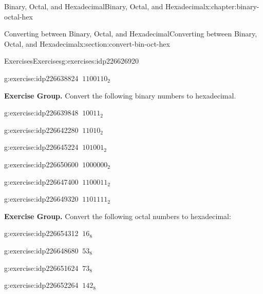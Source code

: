 \documentclass[twoside,10pt,]{book}
\numberwithin{equation}{section}
\begin{document}
\begin{chapterptx}{Binary, Octal, and Hexadecimal}{}{Binary, Octal, and Hexadecimal}{}{}{x:chapter:binary-octal-hex}
\begin{sectionptx}{Converting between Binary, Octal, and Hexadecimal}{}{Converting between Binary, Octal, and Hexadecimal}{}{}{x:section:convert-bin-oct-hex}
\begin{exercises-subsection}{Exercises}{}{Exercises}{}{}{g:exercises:idp226626920}
\begin{exercisegroup}
\begin{divisionexerciseeg}{18}{}{}{g:exercise:idp226638824}%
\(\ 1100110_2\)\end{divisionexerciseeg}%
\end{exercisegroup}
\par\medskip\noindent
\par\medskip\noindent%
\textbf{Exercise Group.}\space\space%
Convert the following binary numbers to hexadecimal.\begin{exercisegroup}
\begin{divisionexerciseeg}{19}{}{}{g:exercise:idp226639848}%
\(\ 10011_2\)\end{divisionexerciseeg}%
\begin{divisionexerciseeg}{20}{}{}{g:exercise:idp226642280}%
\(\ 11010_2\)\end{divisionexerciseeg}%
\begin{divisionexerciseeg}{21}{}{}{g:exercise:idp226645224}%
\(\ 101001_2\)\end{divisionexerciseeg}%
\begin{divisionexerciseeg}{22}{}{}{g:exercise:idp226650600}%
\(\ 1000000_2\)\end{divisionexerciseeg}%
\begin{divisionexerciseeg}{23}{}{}{g:exercise:idp226647400}%
\(\ 1100011_2\)\end{divisionexerciseeg}%
\begin{divisionexerciseeg}{24}{}{}{g:exercise:idp226649320}%
\(\ 1101111_2\)\end{divisionexerciseeg}%
\end{exercisegroup}
\par\medskip\noindent
\par\medskip\noindent%
\textbf{Exercise Group.}\space\space%
Convert the following octal numbers to hexadecimal:\begin{exercisegroup}
\begin{divisionexerciseeg}{25}{}{}{g:exercise:idp226654312}%
\(\ 16_8\)\end{divisionexerciseeg}%
\begin{divisionexerciseeg}{26}{}{}{g:exercise:idp226648680}%
\(\ 53_8\)\end{divisionexerciseeg}%
\begin{divisionexerciseeg}{27}{}{}{g:exercise:idp226651624}%
\(\ 73_8\)\end{divisionexerciseeg}%
\begin{divisionexerciseeg}{28}{}{}{g:exercise:idp226652264}%
\(\ 142_8\)\end{divisionexerciseeg}%

\end{exercisegroup}
\end{exercises-subsection}
\end{sectionptx}
\end{chapterptx}
\end{document}
